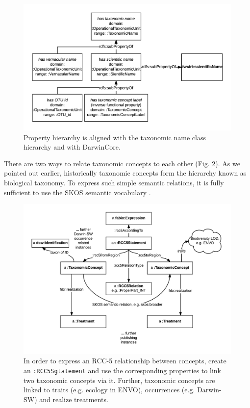 \begin{figure}[h!]
\centering
  \includegraphics[width=\textwidth]{Figures/name-property-hierarchy}
  \decoRule
  \caption[axonomic name property hierarchy diagram.]
  {Property hierarchy is aligned with the taxonomic name class hierarchy and with DarwinCore.}
  \label{name-property-hierarchy}
\end{figure}

There are two ways to relate taxonomic concepts to each other (Fig. \ref{taxonomic-concept-relationships-diagram}). As we pointed out earlier, historically taxonomic concepts form the hierarchy known as biological taxonomy. To express such simple semantic relations, it is fully sufficient to use the SKOS semantic vocabulary \cite{miles_skos_nodate}. 

\begin{figure}[h!]
\centering
  \includegraphics[width=\textwidth]{Figures/taxonomic-concept-relationships-diagram}
  \decoRule
  \caption[Taxonomic concept relationships diagram.]{In order to express an RCC-5 relationship between concepts, create an {\tt :RCC5Sgtatement} and use the corresponding properties to link two taxonomic concepts via it. Further, taxonomic concepts are linked to traits (e.g. ecology in ENVO), occurrences (e.g. Darwin-SW) and realize treatments.}
  \label{taxonomic-concept-relationships-diagram}
\end{figure}


